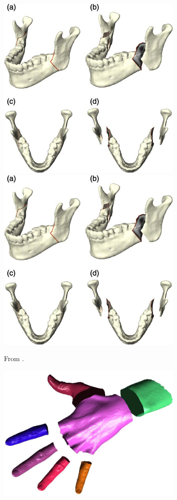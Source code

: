 \documentclass{stdlocal}
\begin{document}
\begin{figure}[b]
  \centering
  \begin{subfigure}[b]{0.32\linewidth}
    \centering
    \includegraphics[width=0.75\linewidth,trim={0px 300 340 30},clip]{images/zachow2003-1.png}
    \includegraphics[width=0.75\linewidth,trim={300px 300 0 30},clip]{images/zachow2003-1.png}
    \caption{From \textcite{zachow2003}.}
    \label{fig:introduction-examples-zachow2003}
  \end{subfigure}
  \hfill
  \begin{subfigure}[b]{0.32\linewidth}
    \centering
    \includegraphics[width=0.85\linewidth]{images/lee2004-1.png}

\end{subfigure}
\end{figure}
\end{document}

